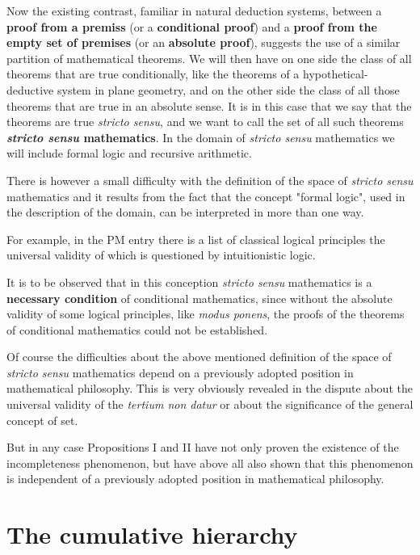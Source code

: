 \documentclass[12pt]{article}
\begin{document}
Now the existing contrast, familiar in natural deduction systems, between a \textbf{proof from a premiss} (or a \textbf{conditional proof}) and a \textbf{proof from the empty set of premises} (or an \textbf{absolute proof}), suggests the use of a similar partition of mathematical theorems. We will then have on one side the class of all theorems that are true conditionally, like the theorems of a hypothetical-deductive system in plane geometry, and on the other side the class of all those theorems that are true in an absolute sense. It is in this case that we say that the theorems are true \emph{stricto sensu}, and we want to call the set of all such theorems \textbf{\emph{stricto sensu} mathematics}. In the domain of \emph{stricto sensu} mathematics we will include formal logic and recursive arithmetic.

There is however a small difficulty with the definition of the space of \emph{stricto sensu} mathematics and it results from the fact that the concept "formal logic", used in the description of the domain, can be interpreted in more than one way.
 
For example, in the PM entry  there is a list of classical logical principles the universal validity of which is questioned by intuitionistic logic.

It is to be observed that in this conception \emph{stricto sensu} mathematics is a \textbf{necessary condition} of conditional mathematics, since without the absolute validity of some logical principles, like \emph{modus ponens}, the proofs of the theorems of conditional mathematics could not be established.

Of course the difficulties about the above mentioned definition of the space of \emph{stricto sensu} mathematics depend on a previously adopted position in mathematical philosophy. This is very obviously revealed in the dispute about the universal validity of the \emph{tertium non datur} or about the significance of the general concept of set.

But in any case Propositions I and II have not only proven the existence of the incompleteness phenomenon, but have above all also shown that this phenomenon is independent of a previously adopted position in mathematical philosophy. 

\section{The cumulative hierarchy}\normalsize
\end{document}
